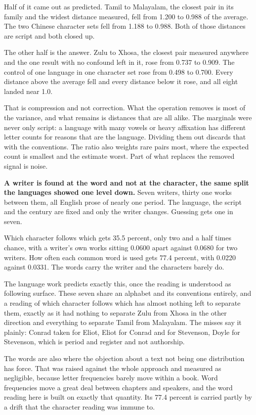 Half of it came out as predicted. Tamil to Malayalam, the closest pair in its family and the widest distance measured, fell from 1.200 to 0.988 of the average. The two Chinese character sets fell from 1.188 to 0.988. Both of those distances are script and both closed up.

The other half is the answer. Zulu to Xhosa, the closest pair measured anywhere and the one result with no confound left in it, rose from 0.737 to 0.909. The control of one language in one character set rose from 0.498 to 0.700. Every distance above the average fell and every distance below it rose, and all eight landed near 1.0.

That is compression and not correction. What the operation removes is most of the variance, and what remains is distances that are all alike. The marginals were never only script: a language with many vowels or heavy affixation has different letter counts for reasons that are the language. Dividing them out discards that with the conventions. The ratio also weights rare pairs most, where the expected count is smallest and the estimate worst. Part of what replaces the removed signal is noise.

\textbf{A writer is found at the word and not at the character, the same split the languages showed one level down.} Seven writers, thirty one works between them, all English prose of nearly one period. The language, the script and the century are fixed and only the writer changes. Guessing gets one in seven.

Which character follows which gets 35.5 percent, only two and a half times chance, with a writer's own works sitting 0.0600 apart against 0.0680 for two writers. How often each common word is used gets 77.4 percent, with 0.0220 against 0.0331. The words carry the writer and the characters barely do.

The language work predicts exactly this, once the reading is understood as following surface. These seven share an alphabet and its conventions entirely, and a reading of which character follows which has almost nothing left to separate them, exactly as it had nothing to separate Zulu from Xhosa in the other direction and everything to separate Tamil from Malayalam. The misses say it plainly: Conrad taken for Eliot, Eliot for Conrad and for Stevenson, Doyle for Stevenson, which is period and register and not authorship.

The words are also where the objection about a text not being one distribution has force. That was raised against the whole approach and measured as negligible, because letter frequencies barely move within a book. Word frequencies move a great deal between chapters and speakers, and the word reading here is built on exactly that quantity. Its 77.4 percent is carried partly by a drift that the character reading was immune to.

